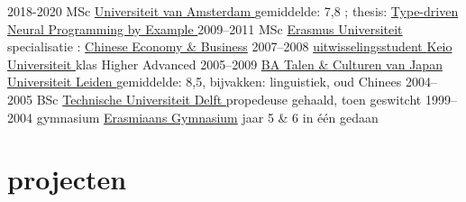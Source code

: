 \documentclass[]{friggeri-cv}
\begin{document}
\begin{entrylist}
  \entry
    {2018-2020}
    {MSc }
    {\href{http://www.uva.nl/}{
      Universiteit van Amsterdam
    }}
    {{
      gemiddelde: 7,8
      }; thesis: \href{https://arxiv.org/abs/2008.12613}{Type-driven Neural Programming by Example
    }}
  \entry
    {2009–2011}
    {MSc }
    {\href{https://www.rsm.nl/}{
      Erasmus Universiteit
    }}
    {
      specialisatie
      :
    \href{https://www.rsm.nl/about-rsm/organisation/expertise-search/chinese-economy/}{Chinese Economy \& Business}}
  \entry
    {2007–2008}
    {\href{https://www.cjs.keio.ac.jp/?page=24}{
      uitwisselingsstudent 
    }}
    {\href{https://www.keio.ac.jp/}{
      Keio Universiteit
    }}
    {klas Higher Advanced}
  \entry
    {2005–2009}
    {\href{https://www.universiteitleiden.nl/onderwijs/opleidingen/bachelor/japanstudies}{BA \normalfont
    {
      Talen \& Culturen van Japan
    }}}
    {\href{https://www.universiteitleiden.nl/}{
      Universiteit Leiden
    }}
    {gemiddelde: 8,5, bijvakken: linguistiek, oud Chinees}
  \entry
    {2004–2005}
    {BSc \href{https://ocw.tudelft.nl/programs/bachelor/technische-informatica/}{}}
    {\href{https://www.tudelft.nl/}{
      Technische Universiteit Delft
    }}
    {propedeuse gehaald, toen geswitcht}
  \entry
    {1999–2004}
    {
      gymnasium
      \href{https://nl.wikipedia.org/wiki/Profiel_natuur_en_techniek}{}}
    {\href{http://www.erasmiaans.nl/}{Erasmiaans Gymnasium}}
    {jaar 5 \& 6 in één gedaan}
\end{entrylist}

\newpage

\section{projecten}
\end{document}
